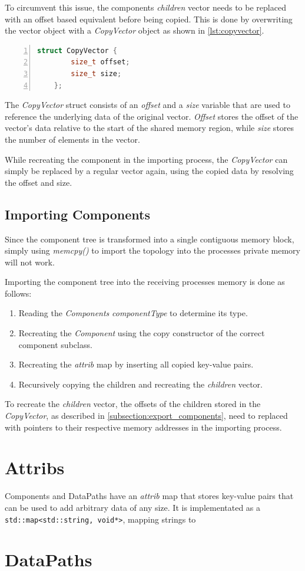 To circumvent this issue, the components \emph{children} vector needs to be replaced with an offset based equivalent before being copied.
This is done by overwriting the vector object with a \emph{CopyVector} object as shown in \autoref{lst:copyvector}.

\begin{lstlisting}[language=c++, numbers=left, caption=Component Class, captionpos=b, label={lst:copyvector}]
    struct CopyVector {
        size_t offset;
        size_t size;
    };
\end{lstlisting}

The \emph{CopyVector} struct consists of an \emph{offset} and a \emph{size} variable that are used to reference the underlying data of the original vector.
\emph{Offset} stores the offset of the vector's data relative to the start of the shared memory region, while \emph{size} stores the number of elements in the vector.

While recreating the component in the importing process, the \emph{CopyVector} can simply be replaced by a regular vector again, using the copied data by resolving the offset and size.

\subsection{Importing Components}
Since the component tree is transformed into a single contiguous memory block, simply using \emph{memcpy()} to import the topology into the processes private memory will not work.

Importing the component tree into the receiving processes memory is done as follows:

\begin{enumerate}
    \item Reading the \emph{Components} \emph{componentType} to determine its type.
    \item Recreating the \emph{Component} using the copy constructor of the correct component subclass.
    \item Recreating the \emph{attrib} map by inserting all copied key-value pairs.
    \item Recursively copying the children and recreating the \emph{children} vector.
\end{enumerate}

To recreate the \emph{children} vector, the offsets of the children stored in the \emph{CopyVector}, as described in \autoref{subsection:export_components},
need to replaced with pointers to their respective memory addresses in the importing process.

\section{Attribs}
Components and DataPaths have an \emph{attrib} map that stores key-value pairs that can be used to add arbitrary data of any size.
It is implementated as a \lstinline{std::map<std::string, void*>}, mapping strings to 
\section{DataPaths}